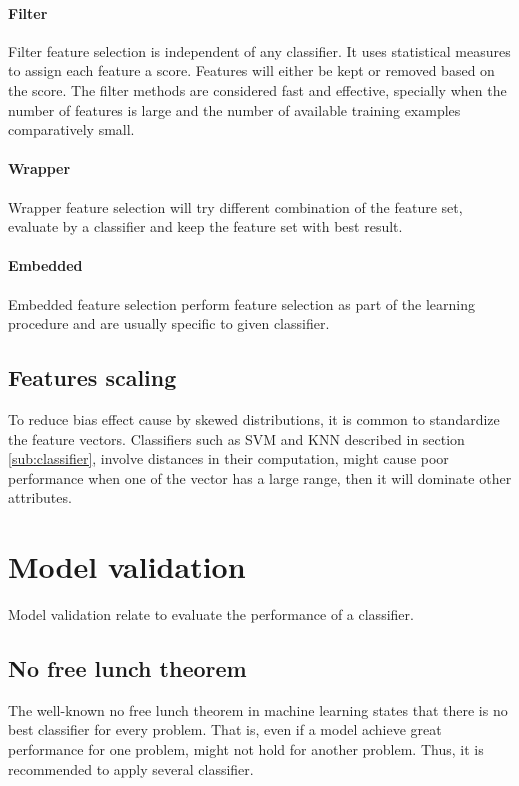 \documentclass[USenglish]{ifimaster}  %
\begin{document}
	
\paragraph{Filter}
Filter feature selection is independent of any classifier. It uses statistical measures to assign each feature a score. Features will either be kept or removed based on the score. The filter methods are considered fast and effective, specially when the number of features is large and the number of available training examples comparatively small.  
	
	
\paragraph{Wrapper}
Wrapper feature selection will try different combination of the feature set, evaluate by a classifier and keep the feature set with best result.
	
	
\paragraph{Embedded}
Embedded feature selection perform feature selection as part of the learning procedure and are usually specific to given classifier.

\subsection{Features scaling} \label{subsec:scaling}
To reduce bias effect cause by skewed distributions, it is common to standardize the feature vectors. Classifiers such as SVM and KNN described in section \ref{sub:classifier}, involve distances in their computation, might cause poor performance when one of the vector has a large range, then it will dominate other attributes.

	
\section{Model validation}
Model validation relate to evaluate the performance of a classifier. 
	
\subsection{No free lunch theorem} \label{seq:nofree}
The well-known no free lunch theorem\cite{NOFREELUNCH} in machine learning states that there is no best classifier for every problem. That is, even if a model achieve great performance for one problem, might not hold for another problem. Thus, it is recommended to apply several classifier.
	
\end{document}

